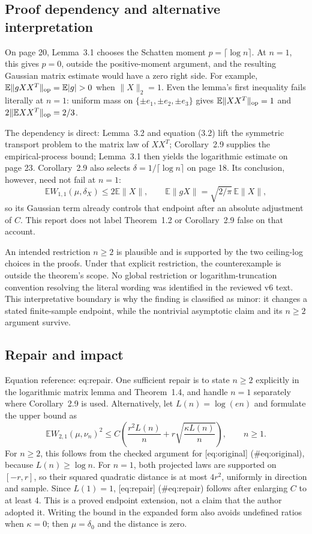 \documentclass[10pt]{article}
\begin{document}
\subsection*{Proof dependency and alternative interpretation}
On page 20, Lemma 3.1 chooses the Schatten moment \(p=\lceil\log n\rceil\). At \(n=1\), this gives \(p=0\), outside the positive-moment argument, and the resulting Gaussian matrix estimate would have a zero right side. For example, \(\mathbb E\|gXX^T\|_{\rm op}=\mathbb E|g|>0\) when \(\|X\|_2=1\). Even the lemma’s first inequality fails literally at \(n=1\): uniform mass on \(\{\pm e_1,\pm e_2,\pm e_3\}\) gives \(\mathbb E\|XX^T\|_{\rm op}=1\) and \(2\|\mathbb E XX^T\|_{\rm op}=2/3\).\par
The dependency is direct: Lemma 3.2 and equation (3.2) lift the symmetric transport problem to the matrix law of \(XX^T\); Corollary 2.9 supplies the empirical-process bound; Lemma 3.1 then yields the logarithmic estimate on page 23. Corollary 2.9 also selects \(\delta=1/\lceil\log n\rceil\) on page 18. Its conclusion, however, need not fail at \(n=1\): \[\mathbb E W_{1,1}(\mu,\delta_X)\leq2\mathbb E\|X\|,
 \qquad
 \mathbb E\|gX\|=\sqrt{2/\pi}\,\mathbb E\|X\|,\] so its Gaussian term already controls that endpoint after an absolute adjustment of \(C\). This report does not label Theorem 1.2 or Corollary 2.9 false on that account.\par
An intended restriction \(n\geq2\) is plausible and is supported by the two ceiling-log choices in the proofs. Under that explicit restriction, the counterexample is outside the theorem’s scope. No global restriction or logarithm-truncation convention resolving the literal wording was identified in the reviewed v6 text. This interpretative boundary is why the finding is classified as minor: it changes a stated finite-sample endpoint, while the nontrivial asymptotic claim and its \(n\geq2\) argument survive.\par
\subsection*{Repair and impact}
Equation reference: eq:repair. One sufficient repair is to state \(n\geq2\) explicitly in the logarithmic matrix lemma and Theorem 1.4, and handle \(n=1\) separately where Corollary 2.9 is used. Alternatively, let \(L(n)=\log(en)\) and formulate the upper bound as \[
 \mathbb E W_{2,1}(\mu,\nu_n)^2
 \leq C\left(\frac{r^2L(n)}n+
                 r\sqrt{\frac{\kappa L(n)}n}\right),\qquad n\geq1.\] For \(n\geq2\), this follows from the checked argument for [eq:original] (\#eq:original), because \(L(n)\geq\log n\). For \(n=1\), both projected laws are supported on \([-r,r]\), so their squared quadratic distance is at most \(4r^2\), uniformly in direction and sample. Since \(L(1)=1\), [eq:repair] (\#eq:repair) follows after enlarging \(C\) to at least 4. This is a proved endpoint extension, not a claim that the author adopted it. Writing the bound in the expanded form also avoids undefined ratios when \(\kappa=0\); then \(\mu=\delta_0\) and the distance is zero.\par
\end{document}
